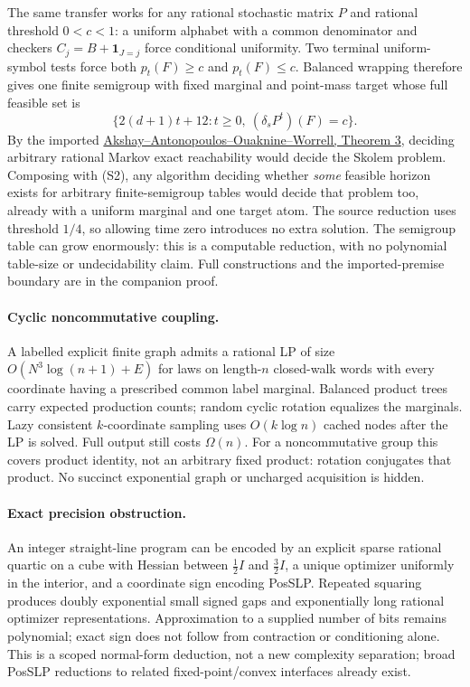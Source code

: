 \documentclass[11pt]{article}
\begin{document}
The same transfer works for any rational stochastic matrix $P$ and rational threshold $0<c<1$: a uniform alphabet with a common denominator and checkers $C_j=B+\mathbf1_{J=j}$ force conditional uniformity. Two terminal uniform-symbol tests force both $p_t(F)\ge c$ and $p_t(F)\le c$. Balanced wrapping therefore gives one finite semigroup with fixed marginal and point-mass target whose full feasible set is
\[
\{2(d+1)t+12:t\ge0,\ (\delta_sP^t)(F)=c\}.
\tag{S2}
\]
By the imported \href{https://people.mpi-sws.org/~joel/publications/markov_reach14.pdf}{Akshay--Antonopoulos--Ouaknine--Worrell, Theorem 3}, deciding arbitrary rational Markov exact reachability would decide the Skolem problem. Composing with (S2), any algorithm deciding whether \emph{some} feasible horizon exists for arbitrary finite-semigroup tables would decide that problem too, already with a uniform marginal and one target atom. The source reduction uses threshold $1/4$, so allowing time zero introduces no extra solution. The semigroup table can grow enormously: this is a computable reduction, with no polynomial table-size or undecidability claim. Full constructions and the imported-premise boundary are in the companion proof.

\paragraph{Cyclic noncommutative coupling.}
A labelled explicit finite graph admits a rational LP of size $O(N^3\log(n+1)+E)$ for laws on length-$n$ closed-walk words with every coordinate having a prescribed common label marginal. Balanced product trees carry expected production counts; random cyclic rotation equalizes the marginals. Lazy consistent $k$-coordinate sampling uses $O(k\log n)$ cached nodes after the LP is solved. Full output still costs $\Omega(n)$. For a noncommutative group this covers product identity, not an arbitrary fixed product: rotation conjugates that product. No succinct exponential graph or uncharged acquisition is hidden.

\paragraph{Exact precision obstruction.}
An integer straight-line program can be encoded by an explicit sparse rational quartic on a cube with Hessian between $\tfrac12I$ and $\tfrac32I$, a unique optimizer uniformly in the interior, and a coordinate sign encoding PosSLP. Repeated squaring produces doubly exponential small signed gaps and exponentially long rational optimizer representations. Approximation to a supplied number of bits remains polynomial; exact sign does not follow from contraction or conditioning alone. This is a scoped normal-form deduction, not a new complexity separation; broad PosSLP reductions to related fixed-point/convex interfaces already exist.
\end{document}
